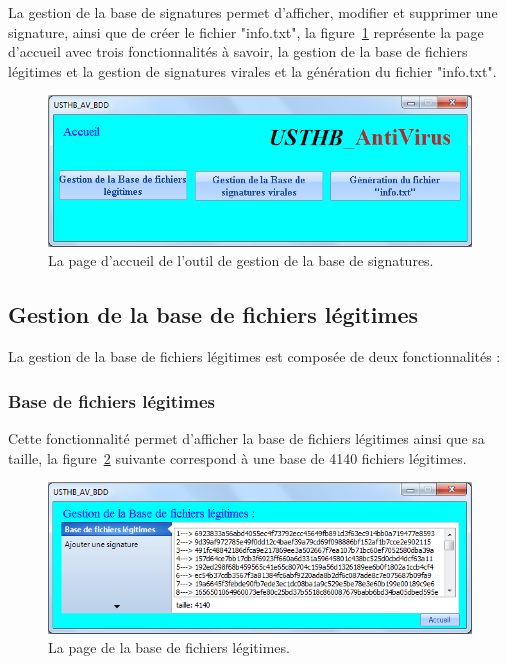 La gestion de la base de signatures permet d'afficher, modifier et supprimer une signature, ainsi que de créer le fichier "info.txt", la figure~\ref{fig :acc} représente la page d'accueil avec  trois fonctionnalités à savoir, la gestion de la base de fichiers légitimes et la gestion de signatures virales et la génération du fichier "info.txt".
\begin{figure}[H]
\begin{center}
\includegraphics[scale=0.6]{Figures/acc.png}
\caption{La page d'accueil de l'outil de gestion de la base de signatures.}
\label{fig :acc} 
\end{center}
\end{figure}

\subsection{Gestion de la base de fichiers légitimes}
La gestion de la base de fichiers légitimes est composée de deux fonctionnalités :

\subsubsection{Base de fichiers légitimes}
Cette fonctionnalité permet d'afficher la base de fichiers légitimes ainsi que sa taille, la figure~\ref{fig :im3} suivante correspond à une base de 4140 fichiers légitimes.
\begin{figure}[H]
\begin{center}
\includegraphics[scale=0.7]{Figures/im3.png}
\caption{La page de la base de fichiers légitimes.}
\label{fig :im3} 
\end{center}
\end{figure}

